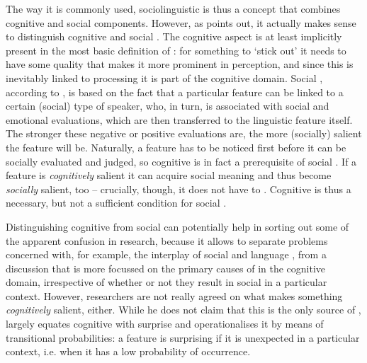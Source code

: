 The way it is commonly used, sociolinguistic  is thus a concept that combines cognitive and social components.
However, as \textcite[cf.][11]{racz2013} points out, it actually makes sense to distinguish cognitive and social .
The cognitive aspect is at least implicitly present in the most basic definition of : for something to `stick out' it needs to have some quality that makes it more prominent in perception, and since this is inevitably linked to processing it is part of the cognitive domain.
Social , according to \textcite[cf.][10]{auer2014}, is based on the fact that a particular feature can be linked to a certain (social) type of speaker, who, in turn, is associated with social and emotional evaluations, which are then transferred to the linguistic feature itself.
The stronger these negative or positive evaluations are, the more (socially) salient the feature will be.
Naturally, a feature has to be noticed first before it can be socially evaluated and judged, so cognitive  is in fact a prerequisite of social .
If a feature is \emph{cognitively} salient it can acquire social meaning and thus become \emph{socially} salient, too -- crucially, though, it does not have to \parencite[cf.][11]{racz2013}.
Cognitive  is thus a necessary, but not a sufficient condition for social .

Distinguishing cognitive from social  can potentially help in sorting out some of the apparent confusion in  research, because it allows to separate problems concerned with, for example, the interplay of social  and language , from a discussion that is more focussed on the primary causes of  in the cognitive domain, irrespective of whether or not they result in social  in a particular context.
However, researchers are not really agreed on what makes something \emph{cognitively} salient, either.
While he does not claim that this is the only source of , \textcite[cf.][9]{racz2013} largely equates cognitive  with surprise and operationalises it by means of transitional probabilities: a feature is surprising if it is unexpected in a particular context, i.e. when it has a low probability of occurrence.


